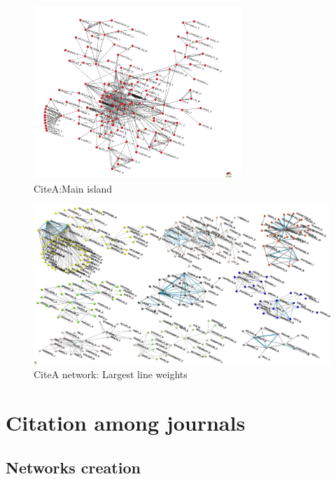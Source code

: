 \documentclass[11pt]{article} %
\begin{document}
\begin{figure}
\begin{center}
\includegraphics[width=0.7\textwidth]{CiteAmIsl.pdf}
\end{center}
\caption{CiteA:Main island} \label{CiteAmisl}
\end{figure}

\begin{figure}
\begin{center}
\includegraphics[width=\textwidth]{CiteA_islands.pdf}
\end{center}
\caption{CiteA network: Largest line weights} \label{CiteAislands}
\end{figure}

\section{Citation among journals}

\subsection{Networks creation}
\end{document}
